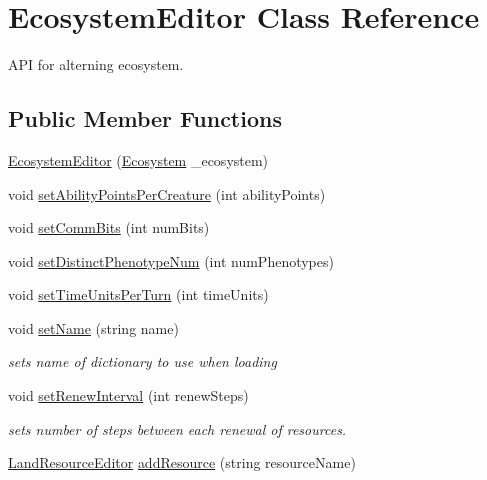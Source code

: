 \hypertarget{class_ecosystem_editor}{}\section{Ecosystem\+Editor Class Reference}
\label{class_ecosystem_editor}


A\+PI for alterning ecosystem.  


\subsection*{Public Member Functions}
\begin{DoxyCompactItemize}
\item 
\mbox{\hyperlink{class_ecosystem_editor_ae398c2a58464b4f994929f22c71c36cc}{Ecosystem\+Editor}} (\mbox{\hyperlink{class_ecosystem}{Ecosystem}} \+\_\+ecosystem)
\item 
void \mbox{\hyperlink{class_ecosystem_editor_a9ac3559972dcc89445df6a6817c938f0}{set\+Ability\+Points\+Per\+Creature}} (int ability\+Points)
\item 
void \mbox{\hyperlink{class_ecosystem_editor_a079f04c589520a420be5c749dcb81447}{set\+Comm\+Bits}} (int num\+Bits)
\item 
void \mbox{\hyperlink{class_ecosystem_editor_a11d1e048c710c397a3cde9354d4117c3}{set\+Distinct\+Phenotype\+Num}} (int num\+Phenotypes)
\item 
void \mbox{\hyperlink{class_ecosystem_editor_a5012174c9ae01075e7749739f2700f69}{set\+Time\+Units\+Per\+Turn}} (int time\+Units)
\item 
void \mbox{\hyperlink{class_ecosystem_editor_a809bdfc28dc15c7cdbb2bde538bd34e9}{set\+Name}} (string name)
\begin{DoxyCompactList}\small\item\em sets name of dictionary to use when loading \end{DoxyCompactList}\item 
void \mbox{\hyperlink{class_ecosystem_editor_a9ba5901625731091af68a400689a2c44}{set\+Renew\+Interval}} (int renew\+Steps)
\begin{DoxyCompactList}\small\item\em sets number of steps between each renewal of resources. \end{DoxyCompactList}\item 
\mbox{\hyperlink{class_land_resource_editor}{Land\+Resource\+Editor}} \mbox{\hyperlink{class_ecosystem_editor_a8473ee588e7e2201b6c57bd7204ec803}{add\+Resource}} (string resource\+Name)

\end{DoxyCompactItemize}
